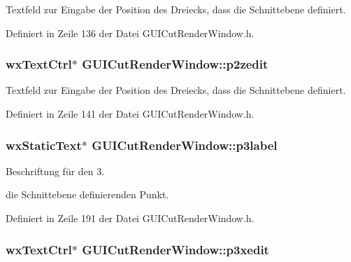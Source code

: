 Textfeld zur Eingabe der Position des Dreiecks, dass die Schnittebene definiert. 



Definiert in Zeile 136 der Datei G\-U\-I\-Cut\-Render\-Window.\-h.

\hypertarget{classGUICutRenderWindow_affad4d5ff6cf42dd585a1a5f0e050075}{
\subsubsection[{p2zedit}]{\setlength{\rightskip}{0pt plus 5cm}wx\-Text\-Ctrl$\ast$ G\-U\-I\-Cut\-Render\-Window\-::p2zedit\hspace{0.3cm}{\ttfamily [private]}}}\label{classGUICutRenderWindow_affad4d5ff6cf42dd585a1a5f0e050075}


Textfeld zur Eingabe der Position des Dreiecks, dass die Schnittebene definiert. 



Definiert in Zeile 141 der Datei G\-U\-I\-Cut\-Render\-Window.\-h.

\hypertarget{classGUICutRenderWindow_a6d1f742f0a78f84882f543f0cbbd6357}{
\subsubsection[{p3label}]{\setlength{\rightskip}{0pt plus 5cm}wx\-Static\-Text$\ast$ G\-U\-I\-Cut\-Render\-Window\-::p3label\hspace{0.3cm}{\ttfamily [private]}}}\label{classGUICutRenderWindow_a6d1f742f0a78f84882f543f0cbbd6357}


Beschriftung für den 3. 

die Schnittebene definierenden Punkt. 

Definiert in Zeile 191 der Datei G\-U\-I\-Cut\-Render\-Window.\-h.

\hypertarget{classGUICutRenderWindow_a3382e7bd629988774c4f5e81bf66ca7e}{
\subsubsection[{p3xedit}]{\setlength{\rightskip}{0pt plus 5cm}wx\-Text\-Ctrl$\ast$ G\-U\-I\-Cut\-Render\-Window\-::p3xedit\hspace{0.3cm}{\ttfamily [private]}}}\label{classGUICutRenderWindow_a3382e7bd629988774c4f5e81bf66ca7e}


